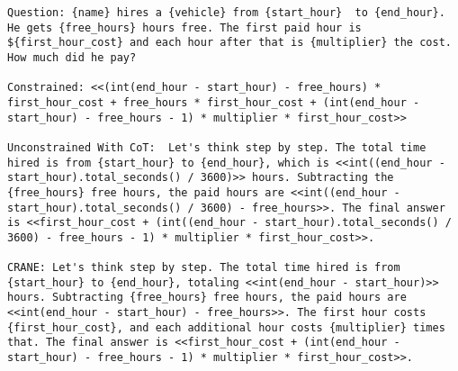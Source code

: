 



\begin{lstlisting}[style=myGrammarStyle, caption=Case Study for GSM-Symbolic]
Question: {name} hires a {vehicle} from {start_hour}  to {end_hour}. He gets {free_hours} hours free. The first paid hour is ${first_hour_cost} and each hour after that is {multiplier} the cost. How much did he pay?

Constrained: <<(int(end_hour - start_hour) - free_hours) * first_hour_cost + free_hours * first_hour_cost + (int(end_hour - start_hour) - free_hours - 1) * multiplier * first_hour_cost>>

Unconstrained With CoT:  Let's think step by step. The total time hired is from {start_hour} to {end_hour}, which is <<int((end_hour - start_hour).total_seconds() / 3600)>> hours. Subtracting the {free_hours} free hours, the paid hours are <<int((end_hour - start_hour).total_seconds() / 3600) - free_hours>>. The final answer is <<first_hour_cost + (int((end_hour - start_hour).total_seconds() / 3600) - free_hours - 1) * multiplier * first_hour_cost>>.

CRANE: Let's think step by step. The total time hired is from {start_hour} to {end_hour}, totaling <<int(end_hour - start_hour)>> hours. Subtracting {free_hours} free hours, the paid hours are <<int(end_hour - start_hour) - free_hours>>. The first hour costs {first_hour_cost}, and each additional hour costs {multiplier} times that. The final answer is <<first_hour_cost + (int(end_hour - start_hour) - free_hours - 1) * multiplier * first_hour_cost>>.


\end{lstlisting}
\label{gram:gsm_case_study}